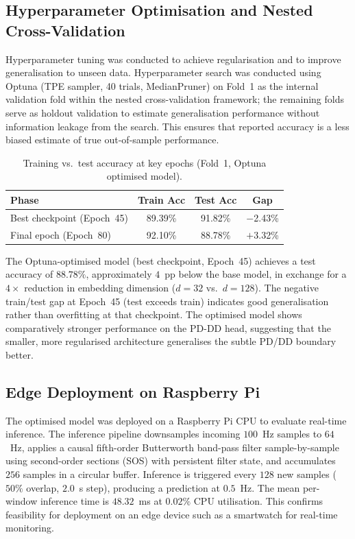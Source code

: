 \documentclass[pmlr]{jmlr}
\begin{document}
\subsection{Hyperparameter Optimisation and Nested Cross-Validation}

Hyperparameter tuning was conducted to achieve regularisation and to
improve generalisation to unseen data. Hyperparameter search was
conducted using Optuna (TPE sampler, 40 trials, MedianPruner) on
Fold~1 as the internal validation fold within the nested
cross-validation framework; the remaining folds serve as holdout
validation to estimate generalisation performance without information
leakage from the search. This ensures that reported accuracy is a less
biased estimate of true out-of-sample performance.

\begin{table}[htbp]
\caption{Training vs.\ test accuracy at key epochs (Fold~1, Optuna
         optimised model).}
\label{tab:train_test_gap}
\begin{center}
\begin{tabular}{lccc}
\toprule
\textbf{Phase} & \textbf{Train Acc} & \textbf{Test Acc} & \textbf{Gap} \\
\midrule
Best checkpoint (Epoch~45) & 89.39\% & 91.82\% & $-$2.43\% \\
Final epoch (Epoch~80)     & 92.10\% & 88.78\% & $+$3.32\% \\
\bottomrule
\end{tabular}
\end{center}
\end{table}

The Optuna-optimised model (best checkpoint, Epoch~45) achieves a
test accuracy of $88.78\%$, approximately $4$~pp below the base model,
in exchange for a $4\times$ reduction in embedding dimension
($d{=}32$ vs.\ $d{=}128$). The negative train/test gap at Epoch~45
(test exceeds train) indicates good generalisation rather than
overfitting at that checkpoint. The optimised model shows
comparatively stronger performance on the PD-DD head, suggesting that
the smaller, more regularised architecture generalises the subtle
PD/DD boundary better.

\subsection{Edge Deployment on Raspberry Pi}
\label{sec:pi}

The optimised model was deployed on a Raspberry Pi CPU to evaluate
real-time inference. The inference pipeline downsamples incoming
$100$~Hz samples to $64$~Hz, applies a causal fifth-order Butterworth
band-pass filter sample-by-sample using second-order sections (SOS)
with persistent filter state, and accumulates $256$ samples in a
circular buffer. Inference is triggered every $128$ new samples
($50\%$ overlap, $2.0$~s step), producing a prediction at $0.5$~Hz.
The mean per-window inference time is $48.32$~ms at $0.02\%$ CPU
utilisation. This confirms feasibility for deployment on an edge
device such as a smartwatch for real-time monitoring.
\end{document}
